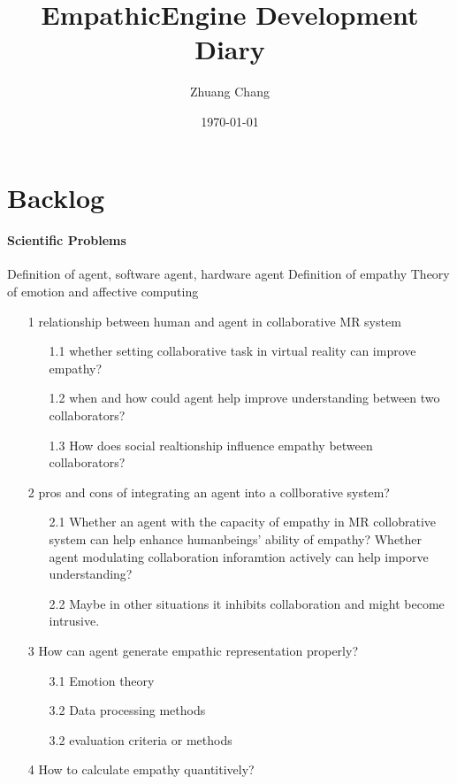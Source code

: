\documentclass{article}
\begin{document}
\title{EmpathicEngine Development Diary}
\author{Zhuang Chang}
\date{\today}

\maketitle


\tableofcontents
\section{Backlog}
\paragraph{Scientific Problems}

Definition of agent, software agent, hardware agent
Definition of empathy
Theory of emotion and affective computing

\begin{enumerate}
\item[1] relationship between human and agent in collaborative MR system
\begin{enumerate}
    \item[1.1]whether setting collaborative task in virtual reality can improve empathy? 
    \item[1.2]when and how could agent help improve understanding between two collaborators?
    \item[1.3] How does social realtionship influence empathy between collaborators?
 
\end{enumerate} 

\item[2]pros and cons of integrating an agent into a collborative system?
\begin{enumerate}
    \item[2.1]Whether an agent with the capacity of empathy in MR collobrative system can help 
    enhance humanbeings' ability of empathy? Whether agent modulating collaboration inforamtion actively can help imporve understanding?
    \item[2.2]Maybe in other situations it inhibits collaboration and might become intrusive.
 
\end{enumerate}

\item[3]How can agent generate empathic representation properly?
\begin{enumerate}
    \item[3.1]Emotion theory
    \item[3.2]Data processing methods 
    \item[3.2]evaluation criteria or methods
 
\end{enumerate} 

\item[4]How to calculate empathy quantitively?


\end{enumerate}
\end{document}
